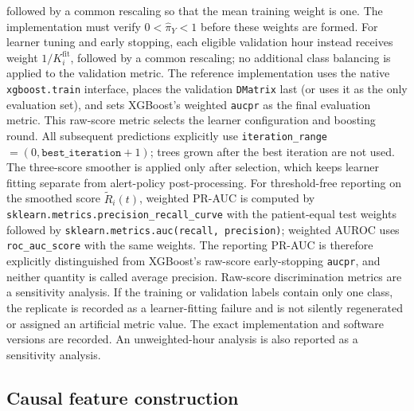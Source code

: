 \documentclass[11pt]{article}
\begin{document}
followed by a common rescaling so that the mean training weight is one. The implementation must verify $0<\widehat\pi_Y<1$ before these weights are formed. For learner tuning and early stopping, each eligible validation hour instead receives weight $1/K_i^{\mathrm{fit}}$, followed by a common rescaling; no additional class balancing is applied to the validation metric. The reference implementation uses the native \texttt{xgboost.train} interface, places the validation \texttt{DMatrix} last (or uses it as the only evaluation set), and sets XGBoost's weighted \texttt{aucpr} as the final evaluation metric. This raw-score metric selects the learner configuration and boosting round. All subsequent predictions explicitly use \texttt{iteration\_range} $=(0,\texttt{best\_iteration}+1)$; trees grown after the best iteration are not used. The three-score smoother is applied only after selection, which keeps learner fitting separate from alert-policy post-processing. For threshold-free reporting on the smoothed score $\widetilde R_i(t)$, weighted PR-AUC is computed by \texttt{sklearn.metrics.precision\_recall\_curve} with the patient-equal test weights followed by \texttt{sklearn.metrics.auc(recall, precision)}; weighted AUROC uses \texttt{roc\_auc\_score} with the same weights. The reporting PR-AUC is therefore explicitly distinguished from XGBoost's raw-score early-stopping \texttt{aucpr}, and neither quantity is called average precision. Raw-score discrimination metrics are a sensitivity analysis. If the training or validation labels contain only one class, the replicate is recorded as a learner-fitting failure and is not silently regenerated or assigned an artificial metric value. The exact implementation and software versions are recorded. An unweighted-hour analysis is also reported as a sensitivity analysis.

\subsection{Causal feature construction}
\end{document}
